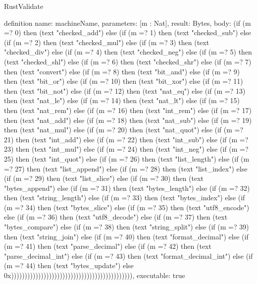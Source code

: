 \begin{lexlean}{RustValidate}
\begin{semanticmodule}
definition{
  name: machineName,
  parameters: [m : Nat],
  result: Bytes,
  body: (if (m =? 0) then (text "checked_add") else (if (m =? 1) then (text "checked_sub") else (if (m =? 2) then (text "checked_mul") else (if (m =? 3) then (text "checked_div") else (if (m =? 4) then (text "checked_neg") else (if (m =? 5) then (text "checked_shl") else (if (m =? 6) then (text "checked_shr") else (if (m =? 7) then (text "convert") else (if (m =? 8) then (text "bit_and") else (if (m =? 9) then (text "bit_or") else (if (m =? 10) then (text "bit_xor") else (if (m =? 11) then (text "bit_not") else (if (m =? 12) then (text "nat_eq") else (if (m =? 13) then (text "nat_le") else (if (m =? 14) then (text "nat_lt") else (if (m =? 15) then (text "nat_rem") else (if (m =? 16) then (text "int_rem") else (if (m =? 17) then (text "nat_add") else (if (m =? 18) then (text "nat_sub") else (if (m =? 19) then (text "nat_mul") else (if (m =? 20) then (text "nat_quot") else (if (m =? 21) then (text "int_add") else (if (m =? 22) then (text "int_sub") else (if (m =? 23) then (text "int_mul") else (if (m =? 24) then (text "int_neg") else (if (m =? 25) then (text "int_quot") else (if (m =? 26) then (text "list_length") else (if (m =? 27) then (text "list_append") else (if (m =? 28) then (text "list_index") else (if (m =? 29) then (text "list_slice") else (if (m =? 30) then (text "bytes_append") else (if (m =? 31) then (text "bytes_length") else (if (m =? 32) then (text "string_length") else (if (m =? 33) then (text "bytes_index") else (if (m =? 34) then (text "bytes_slice") else (if (m =? 35) then (text "utf8_encode") else (if (m =? 36) then (text "utf8_decode") else (if (m =? 37) then (text "bytes_compare") else (if (m =? 38) then (text "string_split") else (if (m =? 39) then (text "string_join") else (if (m =? 40) then (text "format_decimal") else (if (m =? 41) then (text "parse_decimal") else (if (m =? 42) then (text "parse_decimal_int") else (if (m =? 43) then (text "format_decimal_int") else (if (m =? 44) then (text "bytes_update") else 0x))))))))))))))))))))))))))))))))))))))))))))),
  executable: true
}


\end{semanticmodule}
\end{lexlean}
